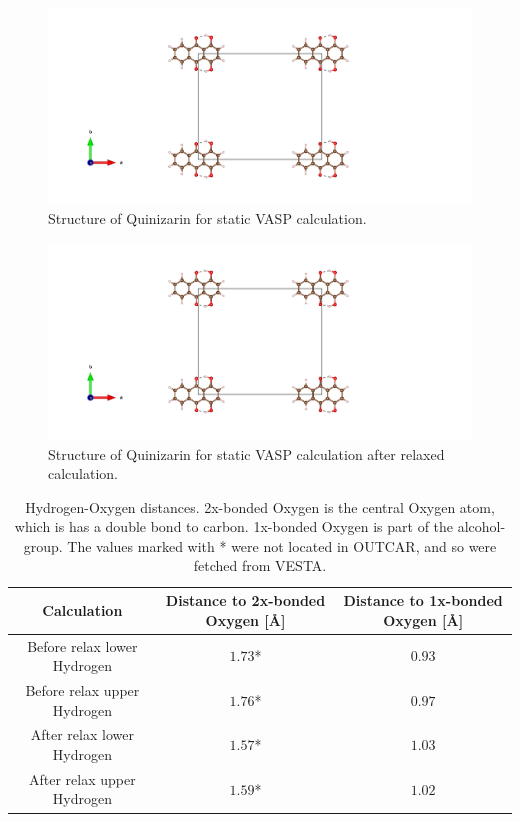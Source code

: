 \documentclass{article}
\begin{document}
      \begin{figure}[H]
        \centering
        \includegraphics[width = \textwidth]{../fig/basic_staticbefore_CONTCAR.png}
        \caption{Structure of Quinizarin for static VASP calculation. }
        \label{fig:basic_staticbefore_CONTCAR}
      \end{figure}

      \begin{figure}[H]
        \centering
        \includegraphics[width = \textwidth]{../fig/basic_staticafter_CONTCAR.png}
        \caption{Structure of Quinizarin for static VASP calculation after relaxed calculation. }
        \label{fig:basic_staticafter_CONTCAR}
      \end{figure}

      \begin{table}[H]
        \centering
        \caption{Hydrogen-Oxygen distances. 2x-bonded Oxygen is the central Oxygen atom, which is has a double bond to carbon. 1x-bonded Oxygen is part of the alcohol-group. The values marked with * were not located in OUTCAR, and so were fetched from VESTA. }
        \label{tab:neighborquinizarin}
        \begin{tabular}{|c|c|c|}
            \hline
            Calculation & Distance to 2x-bonded Oxygen [Å] & Distance to 1x-bonded Oxygen [Å] \\
            \hline \hline
            Before relax lower Hydrogen & $1.73$* & $0.93$ \\
            Before relax upper Hydrogen & $1.76$* & $0.97$ \\
            After relax lower Hydrogen & $1.57$* & $1.03$ \\
            After relax upper Hydrogen & $1.59$* & $1.02$ \\
            \hline
        \end{tabular} \\
        \hspace{0pt}\\
      \end{table}
\end{document}
